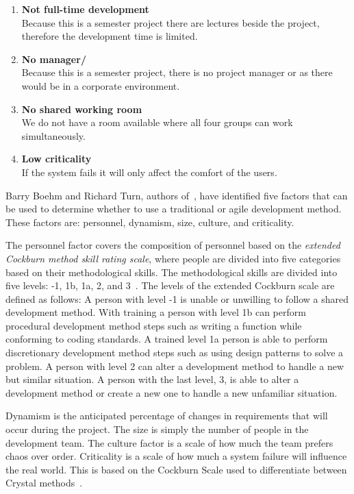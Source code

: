 \begin{enumerate}
	\item \textbf{Not full-time development} \label{enum:halftime}\\
	Because this is a semester project there are lectures beside the project, therefore the development time is limited. 
	\item \textbf{No manager/\productowner{}} \label{enum:manager}\\
	Because this is a semester project, there is no project manager or \productowner{} as there would be in a corporate environment.
	\item \textbf{No shared working room} \label{enum:room}\\
	We do not have a room available where all four groups can work simultaneously.
	\item \textbf{Low criticality} \label{enum:criticality}\\
	If the system fails it will only affect the comfort of the users.
\end{enumerate}
Barry Boehm and Richard Turn, authors of~\citep{boehmTurner}, have identified five factors that can be used to determine whether to use a traditional or agile development method.
These factors are: personnel, dynamism, size, culture, and criticality.

The personnel factor covers the composition of personnel based on the \textit{extended Cockburn method skill rating scale}, where people are divided into five categories based on their methodological skills.
The methodological skills are divided into five levels: -1, 1b, 1a, 2, and 3~\cite[p.~34]{boehmTurner}.
The levels of the extended Cockburn scale are defined as follows:
A person with level -1 is unable or unwilling to follow a shared development method.
With training a person with level 1b can perform procedural development method steps such as writing a function while conforming to coding standards.
A trained level 1a person is able to perform discretionary development method steps such as using design patterns to solve a problem.
A person with level 2 can alter a development method to handle a new but similar situation.
A person with the last level, 3, is able to alter a development method or create a new one to handle a new unfamiliar situation.

Dynamism is the anticipated percentage of changes in requirements that will occur during the project.
The size is simply the number of people in the development team.
The culture factor is a scale of how much the team prefers chaos over order.
Criticality is a scale of how much a system failure will influence the real world.
This is based on the Cockburn Scale used to differentiate between Crystal methods~\cite[pp.~36-37]{Larman04}.


